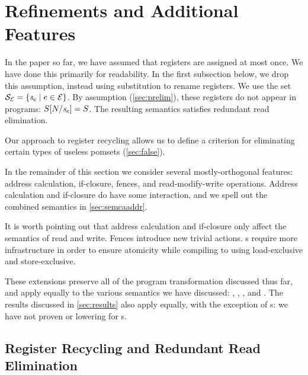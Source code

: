 \section{Refinements and Additional Features} %
\label{sec:additional}

In the paper so far, we have assumed that registers are assigned at most
once.  We have done this primarily for readability.  In the first subsection
below, we drop this assumption, instead using substitution to rename
registers.  We use the set
$\mathcal{S}_{\mathcal{E}}=\{\mathit{s}_{e}\mid e\in\mathcal{E}\}$.  By assumption
(\textsection\ref{sec:prelim}), these registers do not appear in programs:
$S[N/\mathit{s}_{e}]=S$.  The resulting semantics satisfies
redundant read elimination.

Our approach to register recycling allows us to define a criterion for
eliminating certain types of useless pomsets (\textsection\ref{sec:false}).

In the remainder of this section we consider several mostly-orthogonal features: address
calculation, if-closure, fences, and read-modify-write operations.  Address
calculation and if-closure do have some interaction, and we spell out the
combined semantics in \textsection\ref{sec:semcaaddr}.

It is worth pointing out that address calculation and if-closure only affect
the semantics of read and write.  Fences introduce new trivial actions.
\RMW{}s require more infrastructure in order to ensure atomicity while
compiling to \armeight{} using load-exclusive and store-exclusive.

These extensions preserve all of the program transformation discussed thus
far, and apply equally to the various semantics we have discussed: \PwT{},
, , and \PwTc{}.  The results discussed in
\textsection\ref{sec:results} also apply equally, with the exception of
\RMW{}s: we have not proven \drfsc{} or \armeight{} lowering for \RMW{}s.


\subsection{Register Recycling and Redundant Read Elimination}
\label{sec:semreg}

